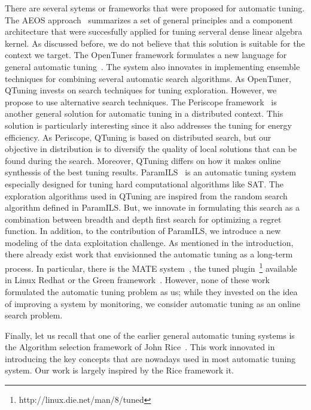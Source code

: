 \documentclass[10pt, conference, compsocconf]{IEEEtran}
\begin{document}
There are several sytems or frameworks that were proposed for automatic tuning. The AEOS approach~\cite{AEOS} 
summarizes a set of general principles and a component architecture that were succesfully applied for tuning  
serveral dense linear algebra kernel. As discussed before, we do not believe that this solution is suitable for the context we target. 
The OpenTuner framework formulates a new language for general automatic tuning~\cite{DBLP:conf/IEEEpact/AnselKVRBOA14}. 
The system also innovates in implementing ensemble techniques for combining several automatic search algorithms. As OpenTuner, QTuning 
invests on search techniques for tuning exploration. However, we propose to use alternative search techniques. 
 The Periscope framework~\cite{DBLP:conf/parco/MijakovicSUGSC13} is another general solution for automatic 
tuning in a distributed context. This solution is particularly interesting since it also addresses the tuning for energy efficiency. 
 As Periscope, QTuning is based on distributed search, but our objective in distribution is to diversify the quality of local solutions 
that can be found during the search. Moreover, QTuning differs on how it makes online synthessis of the best tuning results.
ParamILS~\cite{Hutter:2009:PAA:1734953.1734959} is an automatic tuning system especially designed for tuning hard computational 
algorithms like SAT. The exploration algorithms used in QTuning are inspired from the random search algorithm defined in 
ParamILS. But, we innovate in formulating this search as a combination between breadth and depth first search for optimizing 
a regret function. In addition, to the contribution of ParamILS, we introduce a new modeling of the data exploitation challenge. 
As mentioned in the introduction, there already exist work that envisionned the automatic tuning as a long-term process. In particular, there is the MATE system~\cite{DBLP:conf/para/MorajkoMCMS10}, the tuned plugin~\footnote{http://linux.die.net/man/8/tuned} available 
in Linux Redhat or the Green framework~\cite{Baek:2010:GFS:1809028.1806620}. However, none of these work formulated the 
automatic tuning problem as us; while they invested on the idea of improving a system by monitoring, we consider automatic 
tuning as an online search problem.


Finally, let us recall that one of the earlier general automatic tuning systems is the  Algorithm selection 
framework of John Rice~\cite{Rice}. This work innovated in introducing the key concepts that are nowadays used in most automatic 
tuning system. Our work is largely inspired by the Rice framework it.
\end{document}

